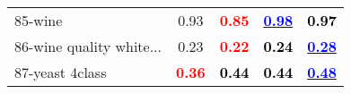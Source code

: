 \begin{table}
\begin{center}
\begin{tabular}{lc|c|c|c}
85-wine &   0.93 & \textcolor{red}{\textbf{  0.85}} & \underline{\textcolor{blue}{\textbf{  0.98}}} & \textcolor{black}{\textbf{  0.97}} \\
86-wine quality white... &   0.23 & \textcolor{red}{\textbf{  0.22}} & \textcolor{black}{\textbf{  0.24}} & \underline{\textcolor{blue}{\textbf{  0.28}}} \\
87-yeast 4class & \textcolor{red}{\textbf{  0.36}} & \textcolor{black}{\textbf{  0.44}} & \textcolor{black}{\textbf{  0.44}} & \underline{\textcolor{blue}{\textbf{  0.48}}} \\\end{tabular}
\label{tab:balaccClassif1}
\end{center}
\end{table}